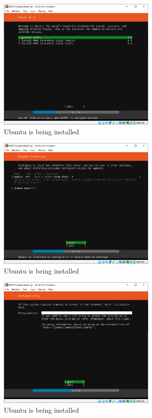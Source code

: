 \documentclass{article}
\begin{document}
\begin{figure}[H]
  \caption{Ubuntu is being installed}
  \centering
  \includegraphics[width=0.7\textwidth]{ECE4310_Proj3_1_installing_3.png}
\end{figure}

\begin{figure}[H]
  \caption{Ubuntu is being installed}
  \centering
  \includegraphics[width=0.7\textwidth]{ECE4310_Proj3_1_installing_4.png}
\end{figure}

\begin{figure}[H]
  \caption{Ubuntu is being installed}
  \centering
  \includegraphics[width=0.7\textwidth]{ECE4310_Proj3_1_installing_5.png}
\end{figure}
\end{document}
